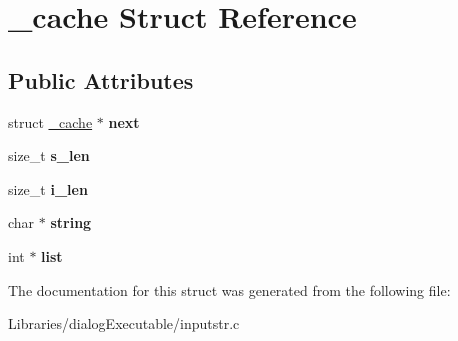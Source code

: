 \hypertarget{struct__cache}{}\section{\+\_\+cache Struct Reference}
\label{struct__cache}
\subsection*{Public Attributes}
\begin{DoxyCompactItemize}
\item 
struct \hyperlink{struct__cache}{\+\_\+cache} $\ast$ {\bfseries next}\hypertarget{struct__cache_acfcdd2e6fe3e69c8602dbef0ebaf6c7e}{}\label{struct__cache_acfcdd2e6fe3e69c8602dbef0ebaf6c7e}

\item 
size\+\_\+t {\bfseries s\+\_\+len}\hypertarget{struct__cache_a0fe865b62e651539a3a36708d5737261}{}\label{struct__cache_a0fe865b62e651539a3a36708d5737261}

\item 
size\+\_\+t {\bfseries i\+\_\+len}\hypertarget{struct__cache_a9687eb56fd8746b00dd2512130a33cba}{}\label{struct__cache_a9687eb56fd8746b00dd2512130a33cba}

\item 
char $\ast$ {\bfseries string}\hypertarget{struct__cache_a0dd7fca165a1f6adf838dd77185102b0}{}\label{struct__cache_a0dd7fca165a1f6adf838dd77185102b0}

\item 
int $\ast$ {\bfseries list}\hypertarget{struct__cache_aa74ba75ab82cb9ad897410649f1d9d11}{}\label{struct__cache_aa74ba75ab82cb9ad897410649f1d9d11}

\end{DoxyCompactItemize}


The documentation for this struct was generated from the following file\+:\begin{DoxyCompactItemize}
\item 
Libraries/dialog\+Executable/inputstr.\+c\end{DoxyCompactItemize}
